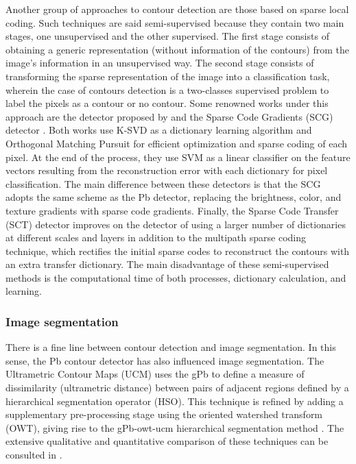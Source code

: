 \documentclass[journal]{IEEEtran}
\begin{document}
Another group of approaches to contour detection are those based on sparse local coding. Such techniques are said semi-supervised because they contain two main stages, one unsupervised and the other supervised. The first stage consists of obtaining a generic representation (without information of the contours) from the image's information in an unsupervised way. The second stage consists of transforming the sparse representation of the image into a classification task, wherein the case of contours detection is a two-classes supervised problem to label the pixels as a contour or no contour. Some renowned works under this approach are the detector proposed by \cite{Mairal.Leordeanu.ea:ECCV:2008} and the Sparse Code Gradients (SCG) detector \cite{Ren.Bo:NIPS:2012}. Both works use K-SVD as a dictionary learning algorithm and Orthogonal Matching Pursuit for efficient optimization and sparse coding of each pixel. At the end of the process, they use SVM as a linear classifier on the feature vectors resulting from the reconstruction error with each dictionary for pixel classification. The main difference between these detectors is that the SCG adopts the same scheme as the Pb detector, replacing the brightness, color, and texture gradients with sparse code gradients. Finally, the Sparse Code Transfer (SCT) detector \cite{Maire.Yu.ea:ACCV:2014} improves on the detector of \cite{Mairal.Leordeanu.ea:ECCV:2008} using a larger number of dictionaries at different scales and layers in addition to the multipath sparse coding technique, which rectifies the initial sparse codes to reconstruct the contours with an extra transfer dictionary. The main disadvantage of these semi-supervised methods is the computational time of both processes, dictionary calculation, and learning. 



\subsubsection{Image segmentation}
There is a fine line between contour detection and image segmentation. In this sense, the Pb contour detector has also influenced image segmentation. The Ultrametric Contour Maps (UCM) \cite{Arbelaez.Maire.ea:PR:2009} uses the gPb to define a measure of dissimilarity (ultrametric distance) between pairs of adjacent regions defined by a hierarchical segmentation operator (HSO). This technique is refined by adding a supplementary pre-processing stage using the oriented watershed transform (OWT), giving rise to the gPb-owt-ucm hierarchical segmentation method \cite{Arbelaez.Maire.ea:PR:2009}. The extensive qualitative and quantitative comparison of these techniques can be consulted in \cite{Arbelaez.Maire.ea:PAMI:2011}.
\end{document}
